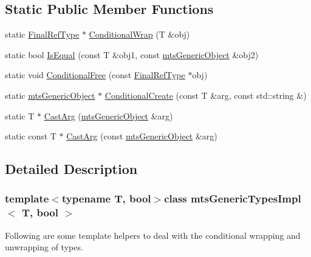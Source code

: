 \subsection*{Static Public Member Functions}
\begin{DoxyCompactItemize}
\item 
static \hyperlink{classmts_generic_types_impl_a9f668541e03e4b56b77f94fa09ffbe96}{Final\-Ref\-Type} $\ast$ \hyperlink{classmts_generic_types_impl_aa175772f0e70fd7d1a9d0dc102ce724b}{Conditional\-Wrap} (T \&obj)
\item 
static bool \hyperlink{classmts_generic_types_impl_aca1b1cd6147ee5821b9af63fa8734ae6}{Is\-Equal} (const T \&obj1, const \hyperlink{classmts_generic_object}{mts\-Generic\-Object} \&obj2)
\item 
static void \hyperlink{classmts_generic_types_impl_a1dcdf3b2bde788bd9041124aaea8f2f3}{Conditional\-Free} (const \hyperlink{classmts_generic_types_impl_a9f668541e03e4b56b77f94fa09ffbe96}{Final\-Ref\-Type} $\ast$obj)
\item 
static \hyperlink{classmts_generic_object}{mts\-Generic\-Object} $\ast$ \hyperlink{classmts_generic_types_impl_a55a866567036c78e0bfd4ebf94ec375e}{Conditional\-Create} (const T \&arg, const std\-::string \&)
\item 
static T $\ast$ \hyperlink{classmts_generic_types_impl_a048024fa657e8ab5535dbedd7c654374}{Cast\-Arg} (\hyperlink{classmts_generic_object}{mts\-Generic\-Object} \&arg)
\item 
static const T $\ast$ \hyperlink{classmts_generic_types_impl_accff9cb086ac17c71f1c35601b1bbfbd}{Cast\-Arg} (const \hyperlink{classmts_generic_object}{mts\-Generic\-Object} \&arg)
\end{DoxyCompactItemize}


\subsection{Detailed Description}
\subsubsection*{template$<$typename T, bool$>$class mts\-Generic\-Types\-Impl$<$ T, bool $>$}

Following are some template helpers to deal with the conditional wrapping and unwrapping of types. 

